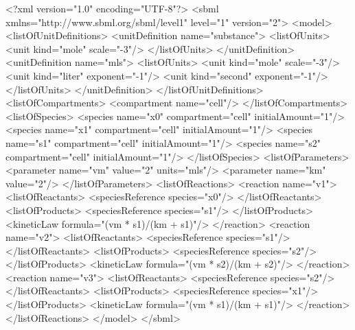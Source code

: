 \documentclass[10pt]{cekarticle}
\newcommand{\changed}[1]{\textcolor{BrickRed}{#1}}
\begin{document}
\begin{example}
<?xml version="1.0" encoding="UTF-8"?>
<sbml xmlns="http://www.sbml.org/sbml/level1" level="1" version="\changed{2}">
    <model>
        <listOfUnitDefinitions>
            <unitDefinition name="substance">
                <listOfUnits>
                    <unit kind="mole" scale="-3"/>
                </listOfUnits>
            </unitDefinition>
            <unitDefinition name="mls">
                <listOfUnits>
                    <unit kind="mole"   scale="-3"/>
                    <unit kind="liter"  exponent="-1"/>
                    <unit kind="second" exponent="-1"/>
                </listOfUnits>
            </unitDefinition>
        </listOfUnitDefinitions>
        <listOfCompartments>
            <compartment name="cell"/>
        </listOfCompartments>
        <listOfSpecies>
            <\changed{species} name="x0" compartment="cell" initialAmount="1"/>
            <\changed{species} name="x1" compartment="cell" initialAmount="1"/>
            <\changed{species} name="s1" compartment="cell" initialAmount="1"/>
            <\changed{species} name="s2" compartment="cell" initialAmount="1"/>
        </listOfSpecies>
        <listOfParameters>
            <parameter name="vm" value="2" units="mls"/>
            <parameter name="km" value="2"/>
        </listOfParameters>
        <listOfReactions>
            <reaction name="v1">
                <listOfReactants>
                    <\changed{speciesReference} \changed{species=}"x0"/>
                </listOfReactants>
                <listOfProducts>
                    <\changed{speciesReference} \changed{species=}"s1"/>
                </listOfProducts>
                <kineticLaw formula="(vm * s1)/(km + s1)"/>
            </reaction>
            <reaction name="v2">
                <listOfReactants>
                    <\changed{speciesReference} \changed{species=}"s1"/>
                </listOfReactants>
                <listOfProducts>
                    <\changed{speciesReference} \changed{species=}"s2"/>
                </listOfProducts>
                <kineticLaw formula="(vm * s2)/(km + s2)"/>
            </reaction>
            <reaction name="v3">
                <listOfReactants>
                    <\changed{speciesReference} \changed{species=}"s2"/>
                </listOfReactants>
                <listOfProducts>
                    <\changed{speciesReference} \changed{species=}"x1"/>
                </listOfProducts>
                <kineticLaw formula="(vm * s1)/(km + s1)"/>
            </reaction>
        </listOfReactions>
    </model>
</sbml>
\end{example}
\end{document}
